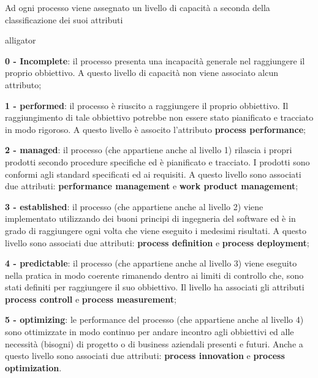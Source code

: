 Ad ogni processo viene assegnato un livello di capacità a seconda della classificazione dei suoi attributi
\begin{labeling}{alligator}
	\item \textbf{0 - Incomplete}: il processo presenta una incapacità generale nel raggiungere il proprio obbiettivo. A questo livello di capacità non viene associato alcun attributo;
	
	\item \textbf{1 - performed}: il processo è riuscito a raggiungere il proprio obbiettivo. Il raggiungimento di tale obbiettivo potrebbe non essere stato pianificato e tracciato in modo rigoroso. A questo livello è associto l'attributo \textbf{process performance};
	
	\item \textbf{2 - managed}: il processo (che appartiene anche al livello 1) rilascia i propri prodotti secondo procedure specifiche ed è pianificato e tracciato. I prodotti sono conformi agli standard specificati ed ai requisiti. A questo livello sono associati due attributi: \textbf{performance management} e \textbf{work product management};
	
	\item \textbf{3 - established}: il processo (che appartiene anche al livello 2) viene implementato utilizzando dei buoni principi di ingegneria del software ed è in grado di raggiungere ogni volta che viene eseguito i medesimi risultati. A questo livello sono associati due attributi: \textbf{process definition} e \textbf{process deployment};
	
	\item \textbf{4 - predictable}: il processo (che appartiene anche al livello 3) viene eseguito nella pratica in modo coerente rimanendo dentro ai limiti di controllo che, sono stati definiti per raggiungere il suo obbiettivo. Il livello ha associati gli attributi \textbf{process controll} e \textbf{process measurement};
	
	\item \textbf{5 - optimizing}: le performance del processo (che appartiene anche al livello 4) sono ottimizzate in modo continuo per andare incontro agli obbiettivi ed alle necessità (bisogni) di progetto o di business aziendali presenti e futuri. %
	Anche a questo livello sono associati due attributi: \textbf{process innovation} e \textbf{process optimization}.
\end{labeling}

